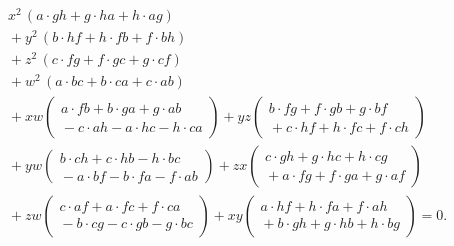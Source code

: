 \documentclass[11pt,a4paper]{article}
\begin{document}
\begin{align*}
& x^2\,(a\cdot gh + g\cdot ha + h\cdot ag) \\
&{}+ y^2\,(b\cdot hf + h\cdot fb + f\cdot bh) \\
&{}+ z^2\,(c\cdot fg + f\cdot gc + g\cdot cf) \\
&{}+ w^2\,(a\cdot bc + b\cdot ca + c\cdot ab) \\
&{}+ xw\left(\begin{array}{l} a\cdot fb + b\cdot ga + g\cdot ab \\ {} - c\cdot ah - a\cdot hc - h\cdot ca \end{array}\right)
   + yz\left(\begin{array}{l} b\cdot fg + f\cdot gb + g\cdot bf \\ {} + c\cdot hf + h\cdot fc + f\cdot ch \end{array}\right) \\
&{}+ yw\left(\begin{array}{l} b\cdot ch + c\cdot hb - h\cdot bc \\ {} - a\cdot bf - b\cdot fa - f\cdot ab \end{array}\right)
   + zx\left(\begin{array}{l} c\cdot gh + g\cdot hc + h\cdot cg \\ {} + a\cdot fg + f\cdot ga + g\cdot af \end{array}\right) \\
&{}+ zw\left(\begin{array}{l} c\cdot af + a\cdot fc + f\cdot ca \\ {} - b\cdot cg - c\cdot gb - g\cdot bc \end{array}\right)
   + xy\left(\begin{array}{l} a\cdot hf + h\cdot fa + f\cdot ah \\ {} + b\cdot gh + g\cdot hb + h\cdot bg \end{array}\right) = 0.
\end{align*}
\end{document}
